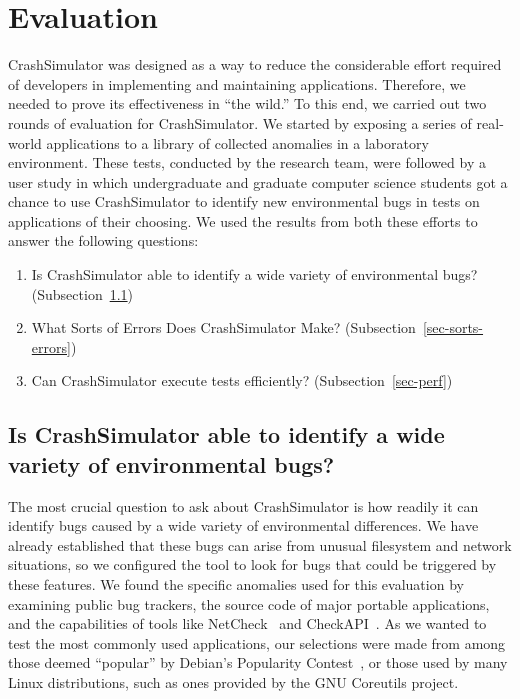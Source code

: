 \section{Evaluation}
\label{SEC:evaluation}

CrashSimulator was designed
as a way to reduce the considerable effort
required of developers
in implementing and maintaining applications.
Therefore,
we needed to prove its effectiveness in ``the wild.''
To this end,
we carried out two rounds of
evaluation for CrashSimulator.
We started by exposing
a series of real-world applications
to a library of collected anomalies in a laboratory environment.
These tests,
conducted by the research team,
were followed by a user study
in which undergraduate and graduate computer science students
got a chance to use CrashSimulator
to identify new environmental bugs
in tests on applications of their choosing.
We used the results from both these efforts
to answer the following questions:

\begin{enumerate}

\item{Is CrashSimulator able to identify a wide variety of environmental
    bugs?
(Subsection~\ref{sec-env-bugs})}

\item{What Sorts of Errors Does CrashSimulator Make?
    (Subsection~\ref{sec-sorts-errors})}

\item{Can CrashSimulator
      execute tests efficiently? (Subsection~\ref{sec-perf})}

\end{enumerate}

\subsection{Is CrashSimulator able to identify a wide variety of
environmental bugs?}
\label{sec-env-bugs}

The most crucial question to ask about CrashSimulator
is how readily it can
identify bugs
caused by a wide variety of environmental differences.
We have already established
that these bugs can arise from
unusual filesystem and network situations,
so we configured the tool to look
for bugs that could be triggered by these features.
We found the specific anomalies used for this evaluation
by examining public bug trackers,
the source code of major portable applications, and the capabilities of
tools like NetCheck~\cite{Zhuang_NSDI_2014}
and CheckAPI~\cite{rasley2015detecting}.
As we wanted to test
the most commonly used applications,
our selections were made
from among those deemed ``popular''
by Debian's Popularity Contest~\cite{DebPopCon},
or those used
by many Linux distributions,
such as ones provided
by the GNU Coreutils project.

